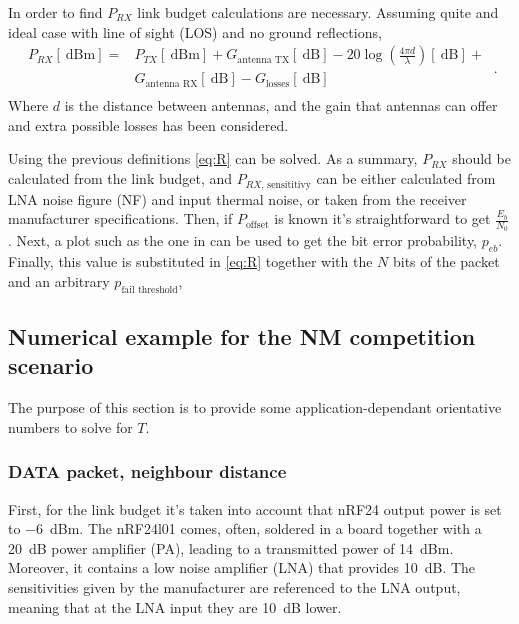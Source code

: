 In order to find $P_{RX}$ link budget calculations are necessary. Assuming quite and ideal case with line of sight (LOS) and no ground reflections,
\begin{equation}
	\begin{split}
		P_{RX} \left[ \SI{}{\dB}\text{m} \right] =& P_{TX} \left[ \SI{}{\dB}\text{m} \right] +  G_{\text{antenna TX}} \left[ \SI{}{\dB} \right]  - 20 \log\left( \frac{4 \pi d}{\lambda} \right) \left[ \SI{}{\dB} \right] +   \\
												  &   G_{\text{antenna RX}} \left[ \SI{}{\dB} \right] -  G_{\text{losses}} \left[ \SI{}{\dB} \right]  \\
	\end{split} \ .
	\label{eq:link}
\end{equation}
Where $d$ is the distance between antennas, and the gain that antennas can offer and extra possible losses has been considered.


Using the previous definitions \eqref{eq:R} can be solved. As a summary, $P_{RX}$ should be calculated from the link budget, and $P_{RX\text{, sensititivy}}$ can be either calculated from LNA noise figure (NF) and input thermal noise, or taken from the receiver manufacturer specifications. Then, if $P_{\text{offset}}$ is known it's straightforward to get $\frac{E_b}{N_0}$. Next, a plot such as the one in  can be used to get the bit error probability, $p_{eb}$. Finally, this value is substituted in \eqref{eq:R} together with the $N$ bits of the packet and an arbitrary $p_{\text{fail threshold}}$,





\subsection{Numerical example for the NM competition scenario}
The purpose of this section is to provide some application-dependant orientative numbers to solve for $T$.


\subsubsection{DATA packet, neighbour distance} \label{sub:data1}
First, for the link budget it's taken into account that nRF24 output power is set to \SI{-6}{\dB}m. The nRF24l01 comes, often, soldered in a board together with a \SI{20}{\dB} power amplifier (PA), leading to a transmitted power of \SI{14}{\dB}m. Moreover, it contains a low noise amplifier (LNA) that provides \SI{10}{\dB}. The sensitivities given by the manufacturer are referenced to the LNA output, meaning that at the LNA input they are \SI{10}{\dB} lower. 

